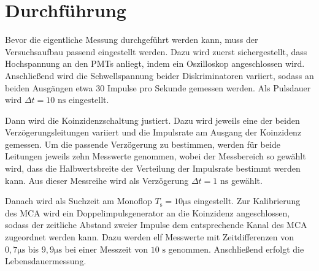 \section{Durchführung}
Bevor die eigentliche Messung durchgeführt werden kann, muss der Versuchsaufbau passend eingestellt werden.
Dazu wird zuerst sichergestellt, dass Hochspannung an den PMTs anliegt, indem ein Oszilloskop angeschlossen
wird. Anschließend wird die Schwellspannung beider Diskriminatoren variiert, sodass an beiden Ausgängen
etwa 30 Impulse pro Sekunde gemessen werden. Als Pulsdauer wird $\Delta t = 10 \text{ ns}$ eingestellt.

Dann wird die Koinzidenzschaltung justiert. Dazu wird jeweils eine der beiden Verzögerungsleitungen 
variiert und die Impulsrate am Ausgang der Koinzidenz gemessen. Um die passende Verzögerung zu bestimmen, werden
für beide Leitungen jeweils zehn Messwerte genommen, wobei der Messbereich so gewählt wird, dass die Halbwertsbreite 
der Verteilung der Impulsrate bestimmt werden kann. Aus dieser Messreihe wird als Verzögerung $\Delta t = 1 \text{ ns}$
gewählt. 

Danach wird als Suchzeit am Monoflop $T_\text{s} = 10 \si{\micro\second}$ eingestellt. Zur Kalibrierung des 
MCA wird ein Doppelimpulsgenerator an die Koinzidenz angeschlossen, sodass der zeitliche Abstand zweier 
Impulse dem entsprechende Kanal des MCA zugeordnet werden kann. Dazu werden elf Messwerte mit Zeitdifferenzen
von $0,7 \si{\micro\second}$ bis $9,9 \si{\micro\second}$ bei einer Messzeit von $10 \text{ s}$ genommen.
Anschließend erfolgt die Lebensdauermessung.